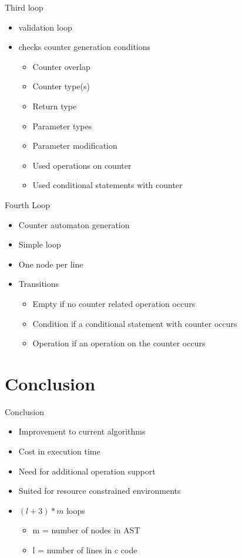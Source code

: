 \documentclass[10pt]{beamer}
\begin{document}
\begin{frame}{Third loop}
	\begin{itemize}
		\item validation loop
		\item checks counter generation conditions
		\begin{itemize}
			\item Counter overlap
			\item Counter type(s)
			\item Return type
			\item Parameter types
			\item Parameter modification
			\item Used operations on counter
			\item Used conditional statements with counter
		\end{itemize}
	\end{itemize}
\end{frame}

\begin{frame}{Fourth Loop}
	\begin{itemize}
		\item Counter automaton generation
		\item Simple loop
		\item One node per line
		\item Transitions
		\begin{itemize}
			\item Empty if no counter related operation occurs
			\item Condition if a conditional statement with counter occurs
			\item Operation if an operation on the counter occurs
		\end{itemize}
	\end{itemize}
\end{frame}

\section{Conclusion}

\begin{frame}{Conclusion}
	\begin{itemize}
		\item Improvement to current algorithms
		\item Cost in execution time
		\item Need for additional operation support
		\item Suited for resource constrained environments
		\item $(l+3)*m$ loops
		\begin{itemize}
			\item m = number of nodes in AST
			\item l = number of lines in c code
		\end{itemize}
	\end{itemize}
\end{frame}
\end{document}

